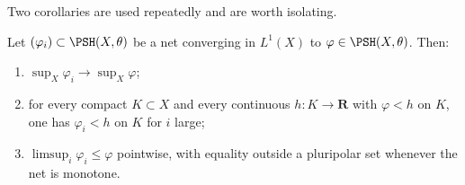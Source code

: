 Two corollaries are used repeatedly and are worth isolating.

\par\noindent\begin{minipage}{\textwidth}
\begin{corollary}\label{cor:ch51-hartogs}
Let $(\varphi_i)\subset\PSH(X,\theta)$ be a net converging in
$L^1(X)$ to $\varphi\in\PSH(X,\theta)$.  Then:
\begin{enumerate}
\item\label{itm:ch51-hartogs:sup}
      $\sup_X\varphi_i\to\sup_X\varphi$;
\item\label{itm:ch51-hartogs:hartogs}
      for every compact $K\subset X$ and every continuous
      $h:K\to\mathbf R$ with $\varphi<h$ on $K$, one has
      $\varphi_i<h$ on $K$ for $i$ large;
\item\label{itm:ch51-hartogs:limsup}
      $\limsup_i\varphi_i\leq\varphi$ pointwise, with equality outside a
      pluripolar set whenever the net is monotone.
\end{enumerate}
\end{corollary}
\end{minipage}\par\medskip

